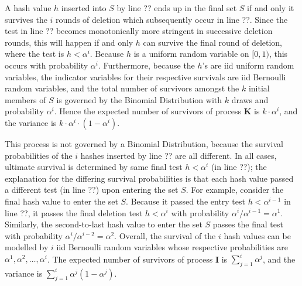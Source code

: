 \documentclass{sig-alternate}
\begin{document}
\vspace{0.5em}
 A hash value $h$ inserted into $S$ by line ?? ends up in the final set $S$ if and only it survives the
$i$ rounds of deletion which subsequently occur in line ??. Since the test in line ?? becomes monotonically more stringent
in successive deletion rounds, this will happen if and only $h$ can survive the final round of deletion, where the test is
$h < \alpha^i$. Because $h$ is a uniform random variable on $[0,1)$, this occurs with probability $\alpha^i$.
Furthermore, because the $h$'s are iid uniform random variables, the indicator variables for their
respective survivals are iid Bernoulli random variables, and the total
number of survivors amongst the $k$ initial members of $S$ is governed by the Binomial Distribution with $k$ draws and
probability $\alpha^i$. Hence the expected number of survivors of process {\bf K} is $k \cdot \alpha^i$, and the variance is $k \cdot \alpha^i \cdot (1 - \alpha^i)$.

\vspace{0.5em}
 This process is not governed by a Binomial
Distribution, because the survival probabilities of the $i$ hashes
inserted by line ?? are all different. 
In all cases, ultimate survival is determined
by same final test $h < \alpha^i$ (in line ??); the explanation
for the differing survival probabilities is that each hash value
passed a different test (in line ??) upon entering the set $S$.
For example, consider the final hash value to enter
the set $S$. Because it passed the entry test $h < \alpha^{i-1}$ in
line ??, it passes the final deletion test $h < \alpha^i$ with
probability $\alpha^i/\alpha^{i-1} = \alpha^1$. Similarly, the
second-to-last hash value to enter the set $S$ passes the final
test with probability $\alpha^i/\alpha^{i-2} = \alpha^2$.  Overall, the survival
of the $i$ hash values can be modelled by $i$ iid Bernoulli
random variables whose respective probabilities are $\alpha^1,
\alpha^2, \ldots, \alpha^i$. The expected number of survivors of
process {\bf I} is $\sum_{j=1}^{i} \alpha^j$, and the variance is
$\sum_{j=1}^{i} \alpha^j (1 -\alpha^j)$.
\end{document}
